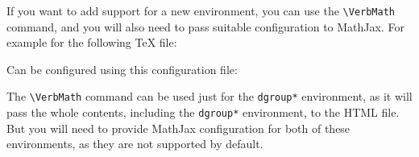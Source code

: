 If you want to add support for a new environment, you can use the \verb|\VerbMath| command, and you will
also need to pass suitable configuration to MathJax. For example for the following TeX file:


Can be configured using this configuration file:

\begin{texsource}
 
\EndPreamble
\end{texsource}

The \verb|\VerbMath| command can be used just for the \verb|dgroup*| environment, as it will pass the
whole contents, including the \verb|dgroup*| environment, to the HTML file. But you will need to 
provide MathJax configuration for both of these environments, as they are not supported by default.


